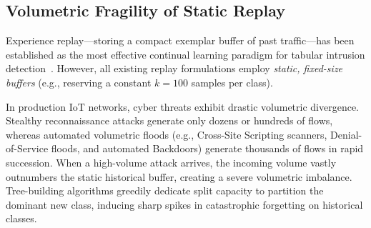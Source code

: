 \documentclass[conference]{IEEEtran}
\begin{document}
\subsection{Volumetric Fragility of Static Replay}
Experience replay—storing a compact exemplar buffer of past traffic—has been established as the most effective continual learning paradigm for tabular intrusion detection~\cite{replay_or_regret2023}. However, all existing replay formulations employ \emph{static, fixed-size buffers} (e.g., reserving a constant $k = 100$ samples per class).

In production IoT networks, cyber threats exhibit drastic volumetric divergence. Stealthy reconnaissance attacks generate only dozens or hundreds of flows, whereas automated volumetric floods (e.g., Cross-Site Scripting scanners, Denial-of-Service floods, and automated Backdoors) generate thousands of flows in rapid succession. When a high-volume attack arrives, the incoming volume vastly outnumbers the static historical buffer, creating a severe volumetric imbalance. Tree-building algorithms greedily dedicate split capacity to partition the dominant new class, inducing sharp spikes in catastrophic forgetting on historical classes.
\end{document}
